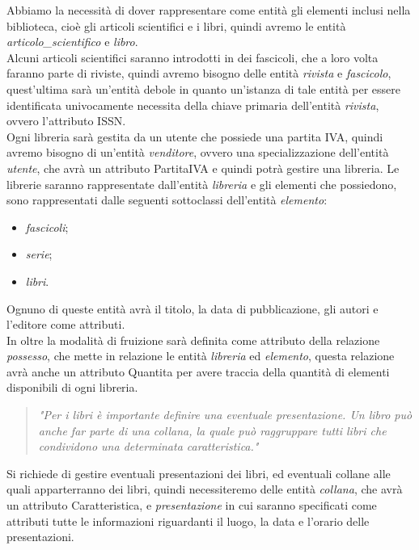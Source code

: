 \documentclass{article}
\begin{document}
Abbiamo la necessità di dover rappresentare come entità gli elementi inclusi nella biblioteca, cioè gli articoli scientifici e i libri, quindi avremo le entità \textit{articolo\_scientifico} e \textit{libro}.\\
Alcuni articoli scientifici saranno introdotti in dei fascicoli, che a loro volta faranno parte di riviste, quindi avremo bisogno delle entità \textit{rivista} e \textit{fascicolo}, quest'ultima sarà un'entità debole in quanto un'istanza di tale entità per essere identificata univocamente necessita della chiave primaria dell'entità \textit{rivista}, ovvero l'attributo ISSN.\\
Ogni libreria sarà gestita da un utente che possiede una partita IVA, quindi avremo bisogno di un'entità \textit{venditore}, ovvero una specializzazione dell'entità \textit{utente}, che avrà un attributo PartitaIVA e quindi potrà gestire una libreria. Le librerie saranno rappresentate dall'entità \textit{libreria} e gli elementi che possiedono, sono rappresentati dalle seguenti sottoclassi dell'entità \textit{elemento}: \begin{itemize} 
\item \textit{fascicoli}; 
\item \textit{serie};
\item \textit{libri}.
\end{itemize}
Ognuno di queste entità avrà il titolo, la data di pubblicazione, gli autori e l'editore come attributi.\\
In oltre la modalità di fruizione sarà definita come attributo della relazione \textit{possesso}, che mette in relazione le entità \textit{libreria} ed \textit{elemento}, questa relazione avrà anche un attributo Quantita per avere traccia della quantità di elementi disponibili di ogni libreria.

\begin{quote}
\textit{"Per i libri è importante definire una eventuale presentazione. Un libro può anche far parte di una collana, la quale può raggruppare tutti libri che condividono una determinata caratteristica."}
\end{quote}

Si richiede di gestire eventuali presentazioni dei libri, ed eventuali collane alle quali apparterranno dei libri, quindi necessiteremo delle entità \textit{collana}, che avrà un attributo Caratteristica, e \textit{presentazione} in cui saranno specificati come attributi tutte le informazioni riguardanti il luogo, la data e l'orario delle presentazioni.
\end{document}
